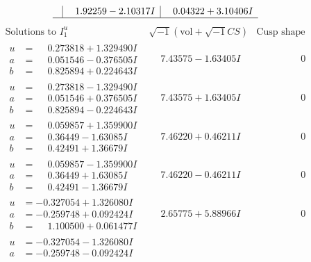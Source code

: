 \documentclass[1p]{elsarticle_modified}
\theoremstyle{definition}
\newcommand{\I}{\sqrt{-1}}
\begin{document}
$$\begin{array}{c|c|c}
 & \phantom{-}1.92259 - 2.10317 I & \phantom{-}0.04322 + 3.10406 I\\
 \hline 
 \end{array}$$\newpage$$\begin{array}{c|c|c}  
\text{Solutions to }I^u_{1}& \I (\text{vol} + \sqrt{-1}CS) & \text{Cusp shape}\\
 \hline 
\begin{aligned}
u &= \phantom{-}0.273818 + 1.329490 I \\
a &= \phantom{-}0.051546 - 0.376505 I \\
b &= \phantom{-}0.825894 + 0.224643 I\end{aligned}
 & \phantom{-}7.43575 - 1.63405 I & \phantom{-0.000000 } 0 \\ \hline\begin{aligned}
u &= \phantom{-}0.273818 - 1.329490 I \\
a &= \phantom{-}0.051546 + 0.376505 I \\
b &= \phantom{-}0.825894 - 0.224643 I\end{aligned}
 & \phantom{-}7.43575 + 1.63405 I & \phantom{-0.000000 } 0 \\ \hline\begin{aligned}
u &= \phantom{-}0.059857 + 1.359900 I \\
a &= \phantom{-}0.36449 - 1.63085 I \\
b &= \phantom{-}0.42491 + 1.36679 I\end{aligned}
 & \phantom{-}7.46220 + 0.46211 I & \phantom{-0.000000 } 0 \\ \hline\begin{aligned}
u &= \phantom{-}0.059857 - 1.359900 I \\
a &= \phantom{-}0.36449 + 1.63085 I \\
b &= \phantom{-}0.42491 - 1.36679 I\end{aligned}
 & \phantom{-}7.46220 - 0.46211 I & \phantom{-0.000000 } 0 \\ \hline\begin{aligned}
u &= -0.327054 + 1.326080 I \\
a &= -0.259748 + 0.092424 I \\
b &= \phantom{-}1.100500 + 0.061477 I\end{aligned}
 & \phantom{-}2.65775 + 5.88966 I & \phantom{-0.000000 } 0 \\ \hline\begin{aligned}
u &= -0.327054 - 1.326080 I \\
a &= -0.259748 - 0.092424 I \\

\end{aligned}
\end{array}$$
\end{document}
